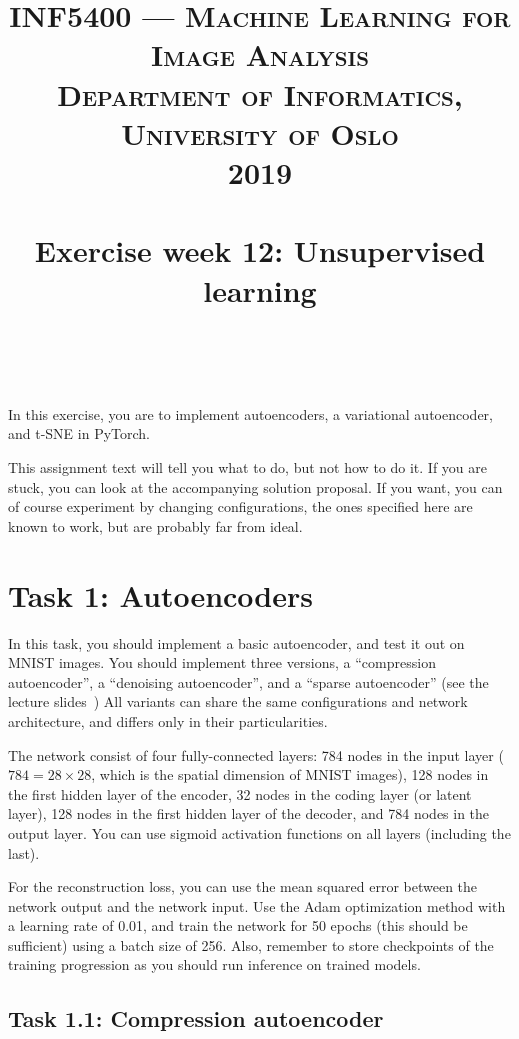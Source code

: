 \documentclass[paper=a4, fontsize=11pt]{article} %
\title{
  \normalfont\normalsize
  \textsc{
    INF5400 --- Machine Learning for Image Analysis \\
    Department of Informatics, University of Oslo \\
    2019
    } \\ [25pt]
  \horrule{0.5pt} \\[0.4cm]
  \huge Exercise week 12: Unsupervised learning \\
  \horrule{2pt} \\[0.5cm]
}
\author{} %
\date{}
\numberwithin{equation}{section} %
\numberwithin{figure}{section} %
\numberwithin{table}{section} %
\begin{document}
\maketitle %

\noindent In this exercise, you are to implement autoencoders, a variational autoencoder, and t-SNE in PyTorch.

This assignment text will tell you what to do, but not how to do it. If you are stuck, you can look
at the accompanying solution proposal. If you want, you can of course experiment by changing
configurations, the ones specified here are known to work, but are probably far from ideal.

\section*{Task 1: Autoencoders}

\noindent In this task, you should implement a basic autoencoder, and test it out on MNIST images. You should
implement three versions, a ``compression autoencoder'', a ``denoising autoencoder'', and a
``sparse autoencoder'' (see the lecture slides~\footnotemark[1])
All variants can share the same configurations and network architecture, and differs only in their
particularities.


The network consist of four fully-connected layers: 784 nodes in the input layer ($784 = 28\times28$,
which is the spatial dimension of MNIST images), 128 nodes in the first hidden layer of the
encoder, 32 nodes in the coding layer (or latent layer), 128 nodes in the first hidden layer of the
decoder, and 784 nodes in the output layer. You can use sigmoid activation functions on all layers
(including the last).

For the reconstruction loss, you can use the mean squared error between the network output and the
network input. Use the Adam optimization method with a learning rate of 0.01, and train the network
for 50 epochs (this should be sufficient) using a batch size of 256. Also, remember to store
checkpoints of the training progression as you should run inference on trained models.

\subsection*{Task 1.1: Compression autoencoder}
\end{document}
